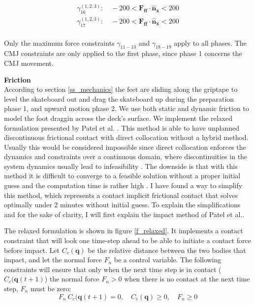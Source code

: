\documentclass[default,iicol]{sn-jnl}
\theoremstyle{thmstyleone}%
\theoremstyle{thmstyletwo}%
\theoremstyle{thmstylethree}%
\begin{document}
\begin{equation}
    \begin{array}{c}
         \gamma_{16}^{(1,2,3)}:\quad  -200 < \mathbf{F_{ff}}\cdot \mathbf{\hat n_x} < 200  \\
         \gamma_{17}^{(1,2,3)}: \quad -200 < \mathbf{F_{ff}}\cdot \mathbf{\hat n_x} < 200 \\ 
    \end{array}
\end{equation}

Only the maximum force constraints $\gamma_{11-13}$ and $\gamma_{18-19}$ apply to all phases. The CMJ constraints are only applied to the first phase, since phase 1 concerns the CMJ movement. 

\textbf{Friction}\\
According to section \ref{ss_mechanics} the feet are sliding along the griptape
to level the skateboard out and drag the skateboard up during the preparation
phase 1, and upward motion phase 2. We use both static and dynamic friction to
model the foot draggin across the deck's surface.
We implement the relaxed formulation presented by Patel et al.
\cite{patel_contact-implicit_2019}.
This method is able to have unplanned discontinuous frictional contact with
direct collocation without a hybrid method.
Usually this would be considered impossible since direct collocation enforces
the dynamics and constraints over a continuous domain, where discontinuities in
the system dynamics usually lead to infeasibility
\cite{kelly_transcription_2017}.
The downside is that with
this method it is difficult to converge to a feasible solution without a proper
initial guess and the computation time is rather high
\cite{shield_contact-implicit_2022,patel_contact-implicit_2019}. I have found a
way to simplify this method, which represents a contact implicit frictional
contact that solves optimally under 2 minutes without initial guess. To explain
the simplifications and for the sake of clarity, I will first explain the
impact method of Patel et al..

The relaxed formulation is shown in figure \ref{f_relaxed}. It implements a
contact constraint that will look one time-step ahead to be able to initiate a
contact force before impact. Let $C_c(\mathbf{q})$ be the relative distance
between the two bodies that impact, and let the normal force $F_n$ be a control
variable. The following constraints will ensure that only when the next time
step is in contact ($C_c(\mathbf{q}(t+1)$) the normal force $F_n > 0$ when
there is no contact at the next time step, $F_n$ must be zero:
%
\begin{equation}\label{e_patelimpact}
    F_n\ C_c(\mathbf{q}(t+1) = 0,\quad C_c(\mathbf{q}) \geq 0,\quad F_n \geq 0
\end{equation}
\end{document}
